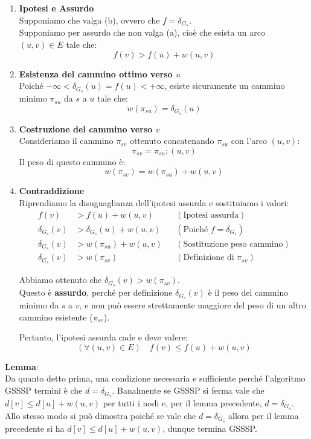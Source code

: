 \begin{enumerate}
    \item \textbf{Ipotesi e Assurdo} \\
    Supponiamo che valga (b), ovvero che $f = \delta_{G_s}$. \\
    Supponiamo per assurdo che non valga (a), cioè che esista un arco $(u, v) \in E$ tale che:
    \[f(v) > f(u) + w(u, v)\]

    \item \textbf{Esistenza del cammino ottimo verso $u$} \\
    Poiché $-\infty < \delta_{G_s}(u) = f(u) < +\infty$, esiste sicuramente un cammino minimo $\pi_{su}$ da $s$ a $u$ tale che:
    \[w(\pi_{su}) = \delta_{G_s}(u)\]

    \item \textbf{Costruzione del cammino verso $v$} \\
    Consideriamo il cammino $\pi_{sv}$ ottenuto concatenando $\pi_{su}$ con l'arco $(u, v)$:
    \[\pi_{sv} = \pi_{su} ; (u, v)\]
    Il peso di questo cammino è:
    \[w(\pi_{sv}) = w(\pi_{su}) + w(u, v)\]
    \item \textbf{Contraddizione} \\
    Riprendiamo la disuguaglianza dell'ipotesi assurda e sostituiamo i valori:
    \begin{align*}
        f(v) &> f(u) + w(u, v) && (\text{Ipotesi assurda}) \\
        \delta_{G_s}(v) &> \delta_{G_s}(u) + w(u, v) && (\text{Poiché } f = \delta_{G_s}) \\
        \delta_{G_s}(v) &> w(\pi_{su}) + w(u, v) && (\text{Sostituzione peso cammino}) \\
        \delta_{G_s}(v) &> w(\pi_{sv}) && (\text{Definizione di } \pi_{sv})
    \end{align*}

    Abbiamo ottenuto che $\delta_{G_s}(v) > w(\pi_{sv})$. \\
    Questo è \textbf{assurdo}, perché per definizione $\delta_{G_s}(v)$ è il peso del cammino minimo da $s$ a $v$, e non può essere strettamente maggiore del peso di un altro cammino esistente ($\pi_{sv}$).
    
    Pertanto, l'ipotesi assurda cade e deve valere:
    \[(\forall (u,v) \in E) \quad f(v) \leq f(u) + w(u,v)\]
\end{enumerate}
\textbf{Lemma}:\\
Da quanto detto prima, una condizione necessaria e sufficiente perché l'algoritmo GSSSP termini è che $d=\delta_{G_s}$. Banalmente se GSSSP si ferma vale che $d[v] \leq d[u] + w(u,v)$ per tutti i nodi e, per il lemma precedente, $d = \delta_{G_s}$. Allo stesso modo si può dimostra poiché se vale che $d=\delta_{G_s}$ allora per il lemma precedente si ha $d[v] \leq d[u] + w(u,v)$, dunque termina GSSSP.

